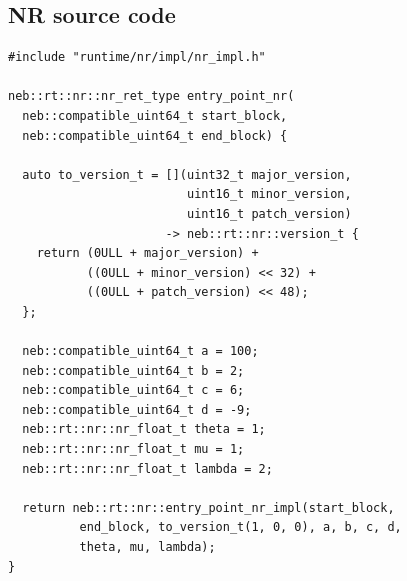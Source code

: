 \documentclass[11pt]{article}
\begin{document}
\subsection{NR source code}
\begin{lstlisting}
#include "runtime/nr/impl/nr_impl.h"

neb::rt::nr::nr_ret_type entry_point_nr(
  neb::compatible_uint64_t start_block,
  neb::compatible_uint64_t end_block) {

  auto to_version_t = [](uint32_t major_version,
                         uint16_t minor_version,
                         uint16_t patch_version)
                      -> neb::rt::nr::version_t {
    return (0ULL + major_version) +
           ((0ULL + minor_version) << 32) +
           ((0ULL + patch_version) << 48);
  };

  neb::compatible_uint64_t a = 100;
  neb::compatible_uint64_t b = 2;
  neb::compatible_uint64_t c = 6;
  neb::compatible_uint64_t d = -9;
  neb::rt::nr::nr_float_t theta = 1;
  neb::rt::nr::nr_float_t mu = 1;
  neb::rt::nr::nr_float_t lambda = 2;

  return neb::rt::nr::entry_point_nr_impl(start_block,
          end_block, to_version_t(1, 0, 0), a, b, c, d,
          theta, mu, lambda);
}
\end{lstlisting}
\end{document}
